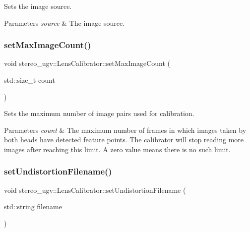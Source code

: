 Sets the image source. 


\begin{DoxyParams}{Parameters}
{\em source} & The image source. \\
\hline
\end{DoxyParams}
\mbox{\label{classstereo__ugv_1_1LensCalibrator_a8171c3a541429bd25ed64eb5140bbf2c}} 
\subsubsection{\texorpdfstring{set\+Max\+Image\+Count()}{setMaxImageCount()}}
{\footnotesize\ttfamily void stereo\+\_\+ugv\+::\+Lens\+Calibrator\+::set\+Max\+Image\+Count (\begin{DoxyParamCaption}\item[{std\+::size\+\_\+t}]{count }\end{DoxyParamCaption})}



Sets the maximum number of image pairs used for calibration. 


\begin{DoxyParams}{Parameters}
{\em count} & The maximum number of frames in which images taken by both heads have detected feature points. The calibrator will stop reading more images after reaching this limit. A zero value means there is no such limit. \\
\hline
\end{DoxyParams}
\mbox{\label{classstereo__ugv_1_1LensCalibrator_a4debdb4b31e7b474576269cc15da15d7}} 
\subsubsection{\texorpdfstring{set\+Undistortion\+Filename()}{setUndistortionFilename()}}
{\footnotesize\ttfamily void stereo\+\_\+ugv\+::\+Lens\+Calibrator\+::set\+Undistortion\+Filename (\begin{DoxyParamCaption}\item[{std\+::string}]{filename }\end{DoxyParamCaption})}



